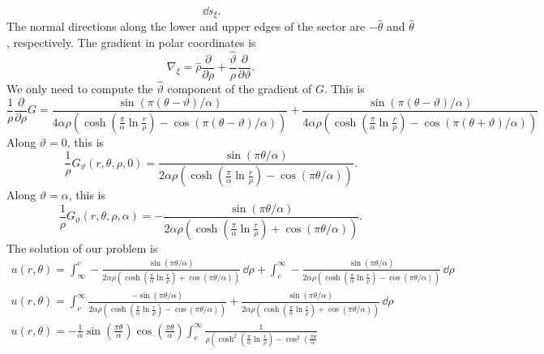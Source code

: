 {\begin{Solution}
\[  \,\dd s_\xi.
  \]
  The normal directions along the lower and upper edges of the sector are
  $- \hat{\theta}$ and $\hat{\theta}$, respectively.  The gradient in
  polar coordinates is
  \[
  \nabla_\xi = \hat{\rho} \frac{\partial}{\partial \rho} + \frac{\hat{\vartheta}}{\rho}
  \frac{\partial }{\partial \vartheta}.
  \]
  We only need to compute the $\hat{\vartheta}$ component of the gradient of
  $G$.  This is
  \[
  \frac{1}{\rho} \frac{\partial}{\partial \rho} G = 
  \frac{ \sin(\pi(\theta-\vartheta)/\alpha) }
  { 4 \alpha \rho \left( \cosh \left( \frac{\pi}{\alpha} 
        \ln \frac{r}{\rho} \right) -\cos(\pi(\theta-\vartheta)/\alpha)\right)}
  + \frac{ \sin(\pi(\theta-\vartheta)/\alpha) }
  { 4 \alpha \rho \left( \cosh \left( \frac{\pi}{\alpha} 
        \ln \frac{r}{\rho} \right) -\cos(\pi(\theta+\vartheta)/\alpha)\right)}
  \]
  Along $\vartheta = 0$, this is
  \[
  \frac{1}{\rho} G_\vartheta(r,\theta,\rho,0) = 
  \frac{ \sin(\pi \theta/\alpha) }
  { 2 \alpha \rho \left( \cosh \left( \frac{\pi}{\alpha} 
        \ln \frac{r}{\rho} \right) -\cos(\pi \theta /\alpha)\right)}.
  \]
  Along $\vartheta = \alpha$, this is
  \[
  \frac{1}{\rho} G_\vartheta(r,\theta,\rho,\alpha) = 
  - \frac{ \sin(\pi \theta/\alpha) }
  { 2 \alpha \rho \left( \cosh \left( \frac{\pi}{\alpha} 
        \ln \frac{r}{\rho} \right) +\cos(\pi \theta /\alpha)\right)}.
  \]
  The solution of our problem is
  \begin{gather*}
    u(r,\theta) = \int_\infty^c
    - \frac{ \sin(\pi \theta/\alpha) }
    { 2 \alpha \rho \left( \cosh \left( \frac{\pi}{\alpha} 
          \ln \frac{r}{\rho} \right) +\cos(\pi \theta /\alpha)\right)} \,\dd \rho
    + \int_c^\infty 
    - \frac{ \sin(\pi \theta/\alpha) }
    { 2 \alpha \rho \left( \cosh \left( \frac{\pi}{\alpha} 
          \ln \frac{r}{\rho} \right) -\cos(\pi \theta /\alpha)\right)} \,\dd \rho\\
    u(r,\theta) = 
    \int_c^\infty 
    \frac{ - \sin(\pi \theta/\alpha) }
    { 2 \alpha \rho \left( \cosh \left( \frac{\pi}{\alpha} 
          \ln \frac{r}{\rho} \right) -\cos(\pi \theta /\alpha)\right)} 
    + \frac{ \sin(\pi \theta/\alpha) }
    { 2 \alpha \rho \left( \cosh \left( \frac{\pi}{\alpha} 
          \ln \frac{r}{\rho} \right) +\cos(\pi \theta /\alpha)\right)} \,\dd \rho\\
    u(r,\theta) = - \frac{1}{\alpha} \sin\left( \frac{\pi \theta}{\alpha} \right)
    \cos\left( \frac{\pi\theta}{\alpha} \right)
    \int_c^\infty 
    \frac{ 1 }{ \rho \left( \cosh^2 \left( \frac{\pi}{\alpha} 
          \ln \frac{r}{\rho} \right) -\cos^2 \left( \frac{\pi \theta}{\alpha}
}
\end{gather*}
\end{Solution}}
